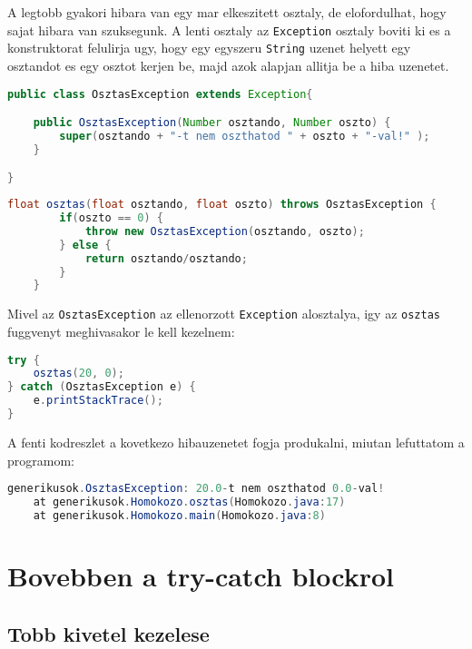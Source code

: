 \documentclass{article}
\let\l\lstinline
\begin{document}
A legtobb gyakori hibara van egy mar elkeszitett osztaly, de elofordulhat, hogy sajat hibara van szuksegunk. A lenti osztaly az \l{Exception} osztaly boviti ki es a konstruktorat felulirja ugy, hogy egy egyszeru \l{String} uzenet helyett egy osztandot es egy osztot kerjen be, majd azok alapjan allitja be a hiba uzenetet.

\begin{lstlisting}[language=Java, caption=Egyedi Exception osztaly]
public class OsztasException extends Exception{

	public OsztasException(Number osztando, Number oszto) {
		super(osztando + "-t nem oszthatod " + oszto + "-val!" );
	}

}
\end{lstlisting}

\begin{lstlisting}[language=Java, caption=Egyedi Exception hasznalata]
	float osztas(float osztando, float oszto) throws OsztasException {
		if(oszto == 0) {
			throw new OsztasException(osztando, oszto);
		} else {
			return osztando/osztando;
		}
	}
\end{lstlisting}

Mivel az \l{OsztasException} az ellenorzott \l{Exception} alosztalya, igy az \l{osztas} fuggvenyt meghivasakor le kell kezelnem:

\begin{lstlisting}[language=Java, caption=Egyedi Exception hasznalata]
try {
    osztas(20, 0);
} catch (OsztasException e) {
    e.printStackTrace();
}
\end{lstlisting}

A fenti kodreszlet a kovetkezo hibauzenetet fogja produkalni, miutan lefuttatom a programom:

\begin{lstlisting}[language=Java, caption=Egyedi Exception uzenete]
generikusok.OsztasException: 20.0-t nem oszthatod 0.0-val!
	at generikusok.Homokozo.osztas(Homokozo.java:17)
	at generikusok.Homokozo.main(Homokozo.java:8)
\end{lstlisting}

\newpage

\section{Bovebben a try-catch blockrol}

\subsection{Tobb kivetel kezelese}
\end{document}
